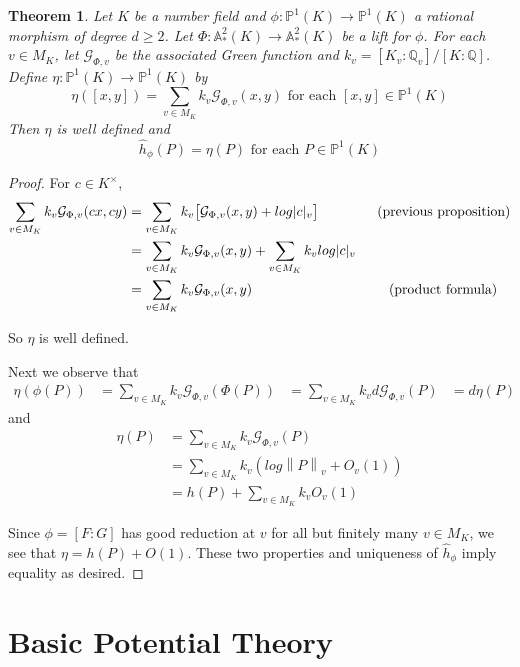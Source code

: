 \documentclass{amsart}
\newtheorem{thm}{Theorem}[section]
\newcommand\norm[1]{\left\lVert#1\right\rVert}
\newcommand{\AFAF}{\mathbb{A}^2}
\newcommand{\Q}{\mathbb{Q}}
\renewcommand{\P}{\mathbb{P}}
\newcommand{\MCG}{\mathcal{G}}
\begin{document}
\begin{thm}
Let $K$ be a number field and $\phi:\P^1(K) \rightarrow \P^1(K)$ a rational morphism of degree $d \geq 2$. Let $\Phi:\AFAF_*(K) \rightarrow \AFAF_*(K)$ be a lift for $\phi$. For each $v \in M_K$, let $\MCG_{\Phi,v}$ be the associated Green function and $k_v = [K_v:\Q_v]/[K:\Q]$. Define $\eta: \P^1(K) \rightarrow \P^1(K)$ by $$\eta([x,y]) = \sum_{v \in M_K}k_v\MCG_{\Phi,v}(x,y) \text{ for each } [x,y] \in \P^1(K)$$ Then $\eta$ is well defined and  $$\hat{h}_{\phi}(P) = \eta(P) \text{ for each } P \in \P^1(K)$$
\end{thm}

\begin{proof}
For $c \in K^{\times}$, 
\begin{align*}
\sum_{v \in M_K}k_v \MCG_{\Phi,v}(cx,cy) 
&= \sum_{v \in M_K}k_v \big[\MCG_{\Phi,v}(x,y)+log|c|_v\big] \hspace{15mm} \text{(previous proposition)}\\
&= \sum_{v \in M_K}k_v \MCG_{\Phi,v}(x,y) +\sum_{v \in M_K}k_vlog|c|_v\\
&= \sum_{v \in M_K}k_v \MCG_{\Phi,v}(x,y) \hspace{35mm}\text{(product formula)}
\end{align*}

\noindent So $\eta$ is well defined.

Next we observe that 
\begin{align*}
\eta (\phi (P)) 
&= \sum_{v \in M_K} k_v \MCG_{\Phi, v}(\Phi(P))
&= \sum_{v \in M_K} k_v d\MCG_{\Phi, v}(P)
&= d \eta(P)
\end{align*} 
and 
\begin{align*}
\eta(P) 
&= \sum_{v \in M_K} k_v \MCG_{\Phi, v}(P)\\
&= \sum_{v \in M_K} k_v (log\norm{P}_v +O_v(1))\\
&= h(P) + \sum_{v \in M_K} k_v O_v(1) 
\end{align*}

Since $\phi = [F:G]$ has good reduction at $v$ for all but finitely many $v \in M_K$, we see that $\eta = h(P)+O(1)$. These two properties and uniqueness of $\hat{h}_{\phi}$ imply equality as desired.

\end{proof}


\section{Basic Potential Theory}
\end{document}

